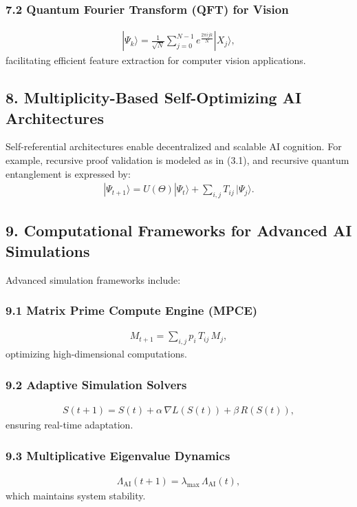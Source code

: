 \documentclass[12pt]{article}
\begin{document}
\subsubsection*{7.2 Quantum Fourier Transform (QFT) for Vision}
\begin{align}
|\Psi_k\rangle = \frac{1}{\sqrt{N}} \sum_{j=0}^{N-1} e^{\frac{2\pi i j k}{N}} |X_j\rangle,
\end{align}
facilitating efficient feature extraction for computer vision applications.

\subsection*{8. Multiplicity-Based Self-Optimizing AI Architectures}
Self-referential architectures enable decentralized and scalable AI cognition. For example, recursive proof validation is modeled as in (3.1), and recursive quantum entanglement is expressed by:
\begin{align}
|\Psi_{t+1}\rangle = U(\Theta)|\Psi_t\rangle + \sum_{i,j} T_{ij}\, |\Psi_j\rangle.
\end{align}

\subsection*{9. Computational Frameworks for Advanced AI Simulations}
Advanced simulation frameworks include:

\subsubsection*{9.1 Matrix Prime Compute Engine (MPCE)}
\begin{align}
M_{t+1} = \sum_{i,j} p_i\, T_{ij}\, M_j,
\end{align}
optimizing high-dimensional computations.

\subsubsection*{9.2 Adaptive Simulation Solvers}
\begin{align}
S(t+1) = S(t) + \alpha\, \nabla L(S(t)) + \beta\, R(S(t)),
\end{align}
ensuring real-time adaptation.

\subsubsection*{9.3 Multiplicative Eigenvalue Dynamics}
\begin{align}
\Lambda_{\text{AI}}(t+1) = \lambda_{\text{max}}\, \Lambda_{\text{AI}}(t),
\end{align}
which maintains system stability.
\end{document}
